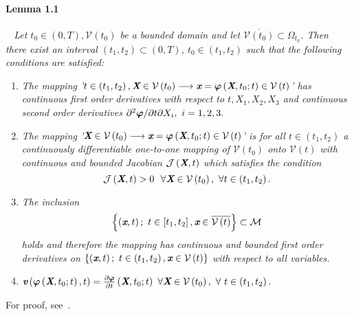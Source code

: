 \paragraph{Lemma 1.1}
\itshape
\ \newline
Let $t_0 \in\left(0,T\right), \mathcal{V}\left(t_0\right)$ be a bounded
 domain and let $\overline{\mathcal{V}\left(t_0\right)}\subset\Omega_{\textit{t}_0}$.
Then there exist an interval $\left(t_1,t_2\right)\subset\left(0,T\right)$, $t_0\in\left(t_1,t_2\right)$ such that the following conditions are satisfied:
\renewcommand{\labelenumi}{\alph{enumi})}
\begin{enumerate}
\upshape
 \item\itshape The mapping '$t\in\left(t_1,t_2\right), \textit{\textbf{X}}\in\mathcal{V}\left(t_0\right)\longrightarrow\textit{\textbf{x}}=\boldsymbol{\varphi}\left(\textit{\textbf{X}},t_0;t\right)\in\mathcal{V}\left(t\right)$' has continuous first order derivatives with respect to $t,X_1,X_2,X_3$ and continuous second order derivatives 
${\partial^2\bsm{\varphi}}/{\partial{t}\partial{{X}_i}},\ i = 1, 2, 3.$
\upshape
 \item\itshape The mapping '$\textit{\textbf{X}}\in\mathcal{V}\left(t_0\right)\longrightarrow\textit{\textbf{x}}= \boldsymbol{\varphi}\left(\textit{\textbf{X}},t_0;t\right)\in\mathcal{V}\left(t\right)$' is for all ${t}\in\left(t_1,t_2\right)$ a continuously differentiable one-to-one mapping of $\mathcal{V}\left(t_0\right)$ onto $\mathcal{V}\left(t\right)$ with continuous and bounded Jacobian $\mathcal{J}\left(\textit{\textbf{X}},t\right)$ which satisfies the condition 
$$
\mc{J}\left(\bs{X},t\right) > 0\ \ \forall\bs{X}\in \mathcal{V}\left(t_0\right),\ \forall{t}\in\left(t_1,t_2\right).$$
 \upshape
 \item\itshape The inclusion $$
\left\{\left(\bs{x},t\right);\ t\in\left[t_1,t_2\right], \bs{x}\in \overline{{\mathcal{V}\left(t\right)}}\right\}\subset\mathcal{M}$$
holds and therefore the mapping  has continuous and bounded first order derivatives on $\left\{\left(\bs{x},t\right);\ t\in\left(t_1,t_2\right), \bs{x}\in\mathcal{V}\left(t\right)\right\}$ with respect to all variables.
\upshape
 \item\itshape $\bs{v}\left(\bsm{\varphi}\left(\bs{X},t_0;t\right),t\right)=\pds{\bsm{\varphi}}{t}\left(\bs{X},t_0;t\right)\ \forall\bs{X}\in\mathcal{V}\left(t_0\right),\ \forall\ t\in\left(t_1,t_2\right).$
\end{enumerate}
\upshape
For proof, see~\cite{1993}.
